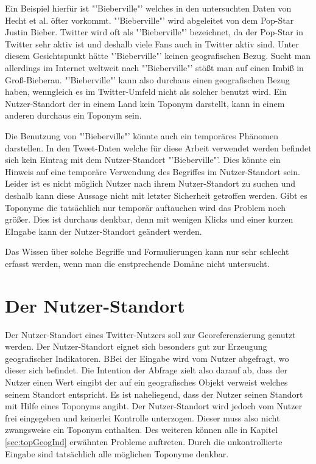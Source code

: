			Ein Beispiel hierfür ist "'Bieberville"' welches in den untersuchten Daten von Hecht et al. öfter vorkommt.
			"'Bieberville"' wird abgeleitet von dem Pop-Star Justin Bieber.	
			Twitter wird oft als "'Bieberville"' bezeichnet, da der Pop-Star in Twitter sehr aktiv ist und deshalb viele Fans auch in Twitter aktiv sind.
			Unter diesem Gesichtspunkt hätte "'Bieberville"' keinen geografischen Bezug.
			Sucht man allerdings im Internet weltweit nach "'Bieberville"' stößt man auf einen Imbiß in Groß-Bieberau.
			"'Bieberville"' kann also durchaus einen geografischen Bezug haben, wenngleich es im Twitter-Umfeld nicht als solcher benutzt wird. 
			Ein Nutzer-Standort der in einem Land kein Toponym darstellt, kann in einem anderen durchaus ein Toponym sein.

			Die Benutzung von "'Bieberville"' könnte auch ein temporäres Phänomen darstellen. 
			In den Tweet-Daten welche für diese Arbeit verwendet werden befindet sich kein Eintrag mit dem Nutzer-Standort "'Bieberville"'.
			Dies könnte ein Hinweis auf eine temporäre Verwendung des Begriffes im Nutzer-Standort sein.
			Leider ist es nicht möglich Nutzer nach ihrem Nutzer-Standort zu suchen und deshalb kann diese Aussage nicht mit letzter Sicherheit getroffen werden. 
			Gibt es Toponyme die tatsächlich nur temporär auftauchen wird das Problem noch größer. 
			Dies ist durchaus denkbar, denn mit wenigen Klicks und einer kurzen EIngabe kann der Nutzer-Standort geändert werden.

			Das Wissen über solche Begriffe und Formulierungen kann nur sehr schlecht erfasst werden, wenn man die enstprechende Domäne nicht untersucht. 
			

			
	\section{Der Nutzer-Standort} \label{sec:nutzerStandort} 

		Der Nutzer-Standort eines Twitter-Nutzers soll zur Georeferenzierung genutzt werden. 
		Der Nutzer-Standort eignet sich besonders gut zur Erzeugung geografischer Indikatoren.
		BBei der Eingabe wird vom Nutzer abgefragt, wo dieser sich befindet. 
		Die Intention der Abfrage zielt also darauf ab, dass der Nutzer einen Wert eingibt der auf ein geografisches Objekt verweist welches seinem Standort entspricht. 
		Es ist naheliegend, dass der Nutzer seinen Standort mit Hilfe eines Toponyms angibt.
		Der Nutzer-Standort wird jedoch vom Nutzer frei eingegeben und keinerlei Kontrolle unterzogen.
		Dieser muss also nicht zwangsweise ein Toponym enthalten. 
		Des weiteren können alle in Kapitel \ref{sec:topGeogInd} erwähnten Probleme auftreten.
		Durch die unkontrollierte Eingabe sind tatsächlich alle möglichen Toponyme denkbar.   
		

